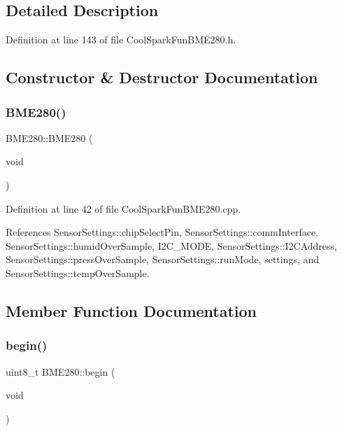 \subsection{Detailed Description}


Definition at line 143 of file Cool\+Spark\+Fun\+B\+M\+E280.\+h.



\subsection{Constructor \& Destructor Documentation}
\mbox{\label{class_b_m_e280_a9b9354e010528a0c3d452aa2459b808c}} 
\subsubsection{\texorpdfstring{B\+M\+E280()}{BME280()}}
{\footnotesize\ttfamily B\+M\+E280\+::\+B\+M\+E280 (\begin{DoxyParamCaption}\item[{void}]{ }\end{DoxyParamCaption})}



Definition at line 42 of file Cool\+Spark\+Fun\+B\+M\+E280.\+cpp.



References Sensor\+Settings\+::chip\+Select\+Pin, Sensor\+Settings\+::comm\+Interface, Sensor\+Settings\+::humid\+Over\+Sample, I2\+C\+\_\+\+M\+O\+DE, Sensor\+Settings\+::\+I2\+C\+Address, Sensor\+Settings\+::press\+Over\+Sample, Sensor\+Settings\+::run\+Mode, settings, and Sensor\+Settings\+::temp\+Over\+Sample.



\subsection{Member Function Documentation}
\mbox{\label{class_b_m_e280_a994c102f010547f9c740a338ef9905c7}} 
\subsubsection{\texorpdfstring{begin()}{begin()}}
{\footnotesize\ttfamily uint8\+\_\+t B\+M\+E280\+::begin (\begin{DoxyParamCaption}\item[{void}]{ }\end{DoxyParamCaption})}




